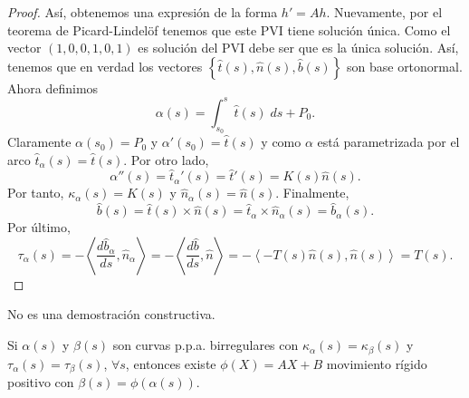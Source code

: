\begin{proof}
Así, obtenemos una expresión de la forma $\displaystyle h' = A h $. Nuevamente, por el teorema de Picard-Lindelöf tenemos que este PVI tiene solución única. Como el vector $\displaystyle \left(1, 0, 0, 1, 0, 1\right) $ es solución del PVI debe ser que es la única solución. Así, tenemos que en verdad los vectores $\displaystyle \left\{ \hat{t}\left(s\right), \hat{n}\left(s\right), \hat{b}\left(s\right)\right\}  $ son base ortonormal. Ahora definimos
\[\alpha\left(s\right)=\int^{s}_{s_{0}} \hat{t}\left(s\right) \; d s + P_{0} .\]
Claramente $\displaystyle \alpha\left(s_{0}\right)=P_{0} $ y $\displaystyle \alpha'\left(s_{0}\right)=\hat{t}\left(s\right) $ y como $\displaystyle \alpha  $ está parametrizada por el arco $\displaystyle \hat{t}_{\alpha }\left(s\right)=\hat{t}\left(s\right) $. 
Por otro lado, 
\[\alpha''\left(s\right)=\hat{t}_{\alpha }'\left(s\right)=\hat{t}'\left(s\right)=K\left(s\right)\hat{n}\left(s\right) .\]
Por tanto, $\displaystyle \kappa_{\alpha }\left(s\right)=K\left(s\right) $ y $\displaystyle \hat{n}_{\alpha }\left(s\right)=\hat{n}\left(s\right) $. Finalmente, 
\[\hat{b}\left(s\right)=\hat{t}\left(s\right) \times \hat{n}\left(s\right)=\hat{t}_{\alpha }\times\hat{n}_{\alpha }\left(s\right)=\hat{b}_{\alpha }\left(s\right) .\]
Por último, 
\[\tau_{\alpha }\left(s\right)=-\left\langle \frac{d\hat{b}_{\alpha }}{d s}, \hat{n}_{\alpha } \right\rangle =-\left\langle \frac{d\hat{b}}{d s}, \hat{n} \right\rangle =-\left\langle -T\left(s\right)\hat{n}\left(s\right), \hat{n}\left(s\right) \right\rangle =T\left(s\right) .\]
\end{proof}
\begin{observation}
No es una demostración constructiva. 
\end{observation}
\begin{colorary}
Si $\displaystyle \alpha\left(s\right) $ y $\displaystyle \beta\left(s\right) $ son curvas p.p.a. birregulares con $\displaystyle \kappa_{\alpha }\left(s\right)=\kappa_{\beta }\left(s\right) $ y $\displaystyle \tau_{\alpha }\left(s\right)=\tau_{\beta }\left(s\right) $, $\displaystyle \forall s  $, 
entonces existe $\displaystyle \phi\left(X\right)=AX + B $ movimiento rígido positivo con $\displaystyle \beta\left(s\right)=\phi\left(\alpha\left(s\right)\right) $.
\end{colorary}
